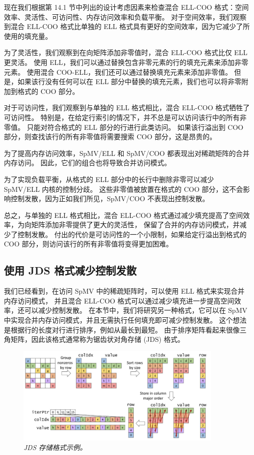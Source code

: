 现在我们根据第 14.1 节中列出的设计考虑因素来检查混合 ELL-COO 格式：空间效率、灵活性、可访问性、内存访问效率和负载平衡。 
对于空间效率，我们观察到混合 ELL-COO 格式比单独的 ELL 格式具有更好的空间效率，因为它减少了所使用的填充量。

为了灵活性，我们观察到在向矩阵添加非零值时，混合 ELL-COO 格式比仅 ELL 更灵活。 
使用 ELL，我们可以通过替换包含非零元素的行的填充元素来添加非零元素。 
使用混合 COO-ELL，我们还可以通过替换填充元素来添加非零值。 
但是，如果该行没有任何可以在 ELL 部分中替换的填充元素，我们也可以将非零附加到格式的 COO 部分。

对于可访问性，我们观察到与单独的 ELL 格式相比，混合 ELL-COO 格式牺牲了可访问性。 
特别是，在给定行索引的情况下，并不总是可以访问该行中的所有非零值。 只能对符合格式的 ELL 部分的行进行此类访问。 
如果该行溢出到 $\mathrm{COO}$ 部分，则查找该行的所有非零值将需要搜索 $\mathrm{COO}$ 部分，这是昂贵的。

为了提高内存访问效率，SpMV/ELL 和 SpMV/COO 都表现出对稀疏矩阵的合并内存访问。 
因此，它们的组合也将导致合并访问模式。

为了实现负载平衡，从格式的 ELL 部分中的长行中删除非零可以减少 SpMV/ELL 内核的控制分歧。 
这些非零值被放置在格式的 $\mathrm{COO}$ 部分，这不会影响控制发散，因为正如我们所见，SpMV/COO 不表现出控制发散。

总之，与单独的 ELL 格式相比，混合 ELL-COO 格式通过减少填充提高了空间效率，为向矩阵添加非零提供了更大的灵活性，
保留了合并的内存访问模式，并减少了控制发散。 
付出的代价是可访问性的一个小限制，如果给定行溢出到格式的 $\mathrm{COO}$ 部分，则访问该行的所有非零值将变得更加困难。

\subsection{使用 JDS 格式减少控制发散}
我们已经看到，在访问 SpMV 中的稀疏矩阵时，可以使用 ELL 格式来实现合并内存访问模式，
并且混合 ELL-COO 格式可以通过减少填充进一步提高空间效率，还可以减少控制发散。 
在本节中，我们将研究另一种格式，它可以在 SpMV 中实现合并内存访问模式，并且无需执行任何填充即可减少控制发散。 
这个想法是根据行的长度对行进行排序，例如从最长到最短。 
由于排序矩阵看起来很像三角矩阵，因此该格式通常称为锯齿状对角存储 (JDS) 格式。

\begin{figure}[H]
	\centering
	\includegraphics[width=0.9\textwidth]{figs/F14.14.png}
	\caption{\textit{JDS 存储格式示例。}}
\end{figure}

